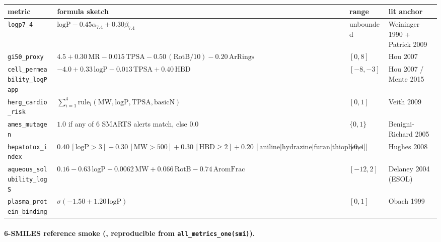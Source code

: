 \begin{center}
\small
\setlength{\tabcolsep}{3pt}
\begin{tabular}{p{}p{}p{}p{}}
\toprule
\textbf{metric} & \textbf{formula sketch} & \textbf{range} & \textbf{lit anchor} \\
\midrule
\texttt{logp7\_4}                & $\mathrm{logP} - 0.45 \alpha_{7.4} + 0.30 \beta_{7.4}$                                  & unbounded & Weininger 1990 + Patrick 2009 \\
\texttt{gi50\_proxy}             & $4.5 + 0.30\,\mathrm{MR} - 0.015\,\mathrm{TPSA} - 0.50\,(\mathrm{RotB}/10) - 0.20\,\mathrm{ArRings}$ & $[0, 8]$ & Hou 2007 \\
\texttt{cell\_permeability\_logPapp} & $-4.0 + 0.33\,\mathrm{logP} - 0.013\,\mathrm{TPSA} + 0.40\,\mathrm{HBD}$                  & $[-8, -3]$ & Hou 2007 / Mente 2015 \\
\texttt{herg\_cardio\_risk}      & $\sum_{i=1}^{4} \mathrm{rule}_i(\mathrm{MW, logP, TPSA, basicN})$                            & $[0, 1]$ & Veith 2009 \\
\texttt{ames\_mutagen}           & $1.0$ if any of 6 SMARTS alerts match, else $0.0$                                          & $\{0, 1\}$ & Benigni-Richard 2005 \\
\texttt{hepatotox\_index}        & $0.40\,[\mathrm{logP}{>}3] + 0.30\,[\mathrm{MW}{>}500] + 0.30\,[\mathrm{HBD}{\geq}2] + 0.20\,[\mathrm{aniline}|\mathrm{hydrazine}|\mathrm{furan}|\mathrm{thiophene}]$ & $[0, 1]$ & Hughes 2008 \\
\texttt{aqueous\_solubility\_logS} & $0.16 - 0.63\,\mathrm{logP} - 0.0062\,\mathrm{MW} + 0.066\,\mathrm{RotB} - 0.74\,\mathrm{AromFrac}$ & $[-12, 2]$ & Delaney 2004 (ESOL) \\
\texttt{plasma\_protein\_binding} & $\sigma(-1.50 + 1.20\,\mathrm{logP})$                                                       & $[0, 1]$ & Obach 1999 \\
\bottomrule
\end{tabular}
\end{center}

\paragraph{6-SMILES reference smoke (\MEASURED{}, reproducible
from \texttt{all\_metrics\_one(smi)}).}

